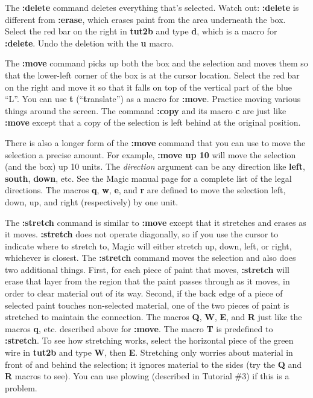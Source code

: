 \documentclass[letterpaper,twoside,12pt]{article}
\begin{document}
The {\bfseries :delete} command deletes everything that's selected.
Watch out:  {\bfseries :delete} is different from {\bfseries :erase}, which erases
paint from the area underneath the box.
Select the red bar on the right in {\bfseries tut2b} and type {\bfseries d},
which is a macro for {\bfseries :delete}.  Undo the deletion with the
{\bfseries u} macro.

The {\bfseries :move} command picks up both the box
and the selection and moves them so that the lower-left corner of
the box is at the cursor location.  Select the red bar on the right
and move it so that it falls on top of the vertical part of
the blue ``L''.  You can use {\bfseries t} (``{\bfseries t}ranslate'') as a macro
for {\bfseries :move}.  Practice moving various things around the screen.
The command {\bfseries :copy} and its macro {\bfseries c} are just like
{\bfseries :move} except that a copy of the selection is left behind at
the original position.

There is also a longer form of the {\bfseries :move} command that you
can use to move the selection a precise amount.  For example,
{\bfseries :move up 10} will move the selection (and the box) up
10 units.  The
{\itshape direction} argument can be any direction like {\bfseries left},
{\bfseries south}, {\bfseries down}, etc.  See the Magic manual page for
a complete list of the legal directions.   The macros {\bfseries q},
{\bfseries w}, {\bfseries e}, and {\bfseries r} are defined to move the selection
left, down, up, and right (respectively) by one unit.

The {\bfseries :stretch} command is similar to {\bfseries :move} except that
it stretches and erases as it moves.  {\bfseries :stretch}  does not
operate diagonally, so if you use the cursor to indicate where
to stretch to, Magic will either stretch up, down, left, or right,
whichever is closest.  The {\bfseries :stretch} command moves the selection
and also does two additional things.  First, for each piece of paint
that moves, {\bfseries :stretch} will erase that layer from the region that
the paint passes through as it moves, in order to clear material out
of its way.  Second, if the back edge of a piece of selected paint touches
non-selected material, one of the two pieces of paint is stretched to
maintain the connection.  The macros {\bfseries Q}, {\bfseries W}, {\bfseries E}, and {\bfseries R}
just like
the macros {\bfseries q}, etc. described above for {\bfseries :move}.  The macro
{\bfseries T} is predefined to {\bfseries :stretch}.
To see how stretching works, select the horizontal
piece of the green wire in {\bfseries tut2b} and type {\bfseries W}, then {\bfseries E}.
Stretching only worries about material in front of and behind the
selection;  it ignores material to the sides (try the {\bfseries Q} and {\bfseries R}
macros to see).  You can use plowing (described in Tutorial  \#3) if this is a
problem.
\end{document}
